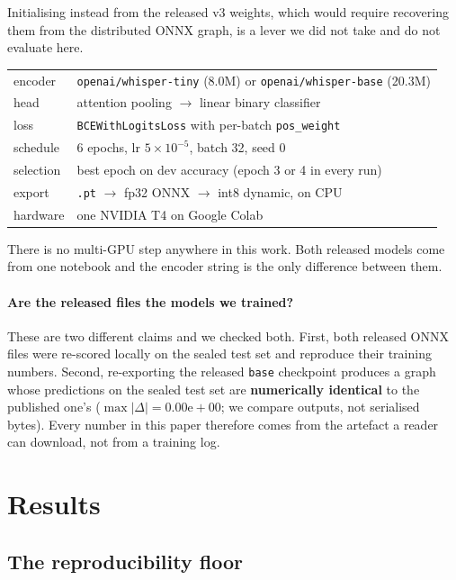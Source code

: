 \documentclass[11pt]{article}
\begin{document}
Initialising instead from the released v3 weights, which would require recovering
them from the distributed ONNX graph, is a lever we did not take and do not
evaluate here.

\begin{center}\small
\begin{tabular}{ll}
\toprule
encoder & \texttt{openai/whisper-tiny} (8.0M) or \texttt{openai/whisper-base} (20.3M) \\
head & attention pooling $\rightarrow$ linear binary classifier \\
loss & \texttt{BCEWithLogitsLoss} with per-batch \texttt{pos\_weight} \\
schedule & 6 epochs, lr $5\times10^{-5}$, batch 32, seed 0 \\
selection & best epoch on dev accuracy (epoch 3 or 4 in every run) \\
export & \texttt{.pt} $\rightarrow$ fp32 ONNX $\rightarrow$ int8 dynamic, on CPU \\
hardware & one NVIDIA T4 on Google Colab \\
\bottomrule
\end{tabular}
\end{center}

There is no multi-GPU step anywhere in this work. Both released models come from
one notebook and the encoder string is the only difference between them.

\paragraph{Are the released files the models we trained?} These are two
different claims and we checked both. First, both released ONNX files were
re-scored locally on the sealed test set and reproduce their training numbers.
Second, re-exporting the released \texttt{base} checkpoint produces a graph whose
predictions on the sealed test set are \textbf{numerically identical} to the
published one's ($\max|\Delta| = 0.00\mathrm{e}{+}00$; we compare outputs, not
serialised bytes).
Every number in this paper therefore comes from the artefact a reader can
download, not from a training log.

\section{Results}
\label{sec:results}

\subsection{The reproducibility floor}
\end{document}
